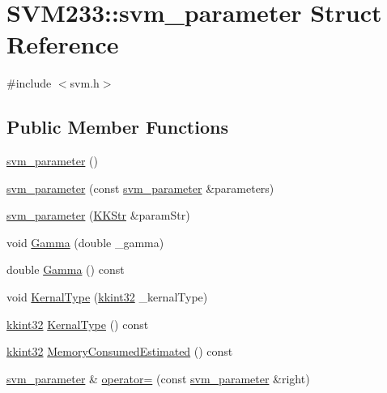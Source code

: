 \hypertarget{struct_s_v_m233_1_1svm__parameter}{}\section{S\+V\+M233\+:\+:svm\+\_\+parameter Struct Reference}
\label{struct_s_v_m233_1_1svm__parameter}


{\ttfamily \#include $<$svm.\+h$>$}

\subsection*{Public Member Functions}
\begin{DoxyCompactItemize}
\item 
\hyperlink{struct_s_v_m233_1_1svm__parameter_a680b87232510554241d3ad5a1fd30f7d}{svm\+\_\+parameter} ()
\item 
\hyperlink{struct_s_v_m233_1_1svm__parameter_a85b6ff8ff23d197d9936c0e6664766d5}{svm\+\_\+parameter} (const \hyperlink{struct_s_v_m233_1_1svm__parameter}{svm\+\_\+parameter} \&parameters)
\item 
\hyperlink{struct_s_v_m233_1_1svm__parameter_aa1fd6cf4832412817fc3718e0ac383be}{svm\+\_\+parameter} (\hyperlink{class_k_k_b_1_1_k_k_str}{K\+K\+Str} \&param\+Str)
\item 
void \hyperlink{struct_s_v_m233_1_1svm__parameter_a027beafb4ebb5704a76522e03f9b35d6}{Gamma} (double \+\_\+gamma)
\item 
double \hyperlink{struct_s_v_m233_1_1svm__parameter_ac04531aafe79a294e91aa86ee342698d}{Gamma} () const 
\item 
void \hyperlink{struct_s_v_m233_1_1svm__parameter_aa2a2d663867b1d60c71a8fd2f1da3318}{Kernal\+Type} (\hyperlink{namespace_k_k_b_a8fa4952cc84fda1de4bec1fbdd8d5b1b}{kkint32} \+\_\+kernal\+Type)
\item 
\hyperlink{namespace_k_k_b_a8fa4952cc84fda1de4bec1fbdd8d5b1b}{kkint32} \hyperlink{struct_s_v_m233_1_1svm__parameter_ad09690b44960fdfe1d4d2dcf0d218088}{Kernal\+Type} () const 
\item 
\hyperlink{namespace_k_k_b_a8fa4952cc84fda1de4bec1fbdd8d5b1b}{kkint32} \hyperlink{struct_s_v_m233_1_1svm__parameter_af7bd0cda5d8fd766b61ba2602f71fc1b}{Memory\+Consumed\+Estimated} () const 
\item 
\hyperlink{struct_s_v_m233_1_1svm__parameter}{svm\+\_\+parameter} \& \hyperlink{struct_s_v_m233_1_1svm__parameter_aa523d3352c546d95cd8d3e8212a20f19}{operator=} (const \hyperlink{struct_s_v_m233_1_1svm__parameter}{svm\+\_\+parameter} \&right)

\end{DoxyCompactItemize}
